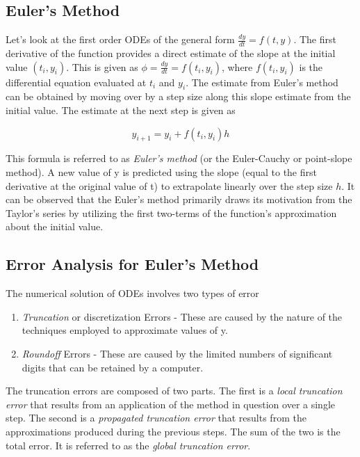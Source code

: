 \documentclass[book.tex]{subfiles}
\begin{document}
\subsection{Euler's Method}
Let's look at the first order ODEs of the general form $\frac{dy}{dt} = f(t,y)$. The first derivative of the function provides a direct estimate of the slope at the initial value $(t_i,y_i)$. This is given as $\phi = \frac{dy}{dt} = f(t_i,y_i)$,  where $f(t_i,y_i)$ is the differential equation evaluated at $t_i$ and $y_i$. The estimate from Euler's method can be obtained by moving over by a step size along this slope estimate from the initial value. The estimate at the next step is given as 

\begin{equation*}
y_{i+1} = y_{i} + f(t_i,y_i)h
\end{equation*}


This formula is referred to as \textit{Euler’s method} (or the Euler-Cauchy or point-slope method). A new value of y is predicted using the slope (equal to the first derivative at the original value of t) to extrapolate linearly over the step size $h$. It can be observed that the Euler's method primarily draws its motivation from the Taylor's series by utilizing the first two-terms of the function's approximation about the initial value.

\subsection{Error Analysis for Euler's Method}

The numerical solution of ODEs involves two types of error

\begin{enumerate}
	\item \textit{Truncation} or discretization Errors - These are caused by the nature of the techniques employed to approximate values of y.
	\item \textit{Roundoff} Errors - These are caused by the limited numbers of significant digits that can be retained by a computer.
\end{enumerate}

The truncation errors are composed of two parts. The first is a \textit{local truncation error} that results from an application of the method in question over a single step. The second is a \textit{propagated truncation error} that results from the approximations produced during the previous steps. The sum of the two is the total error. It is referred to as the \textit{global truncation error}.
\end{document}
